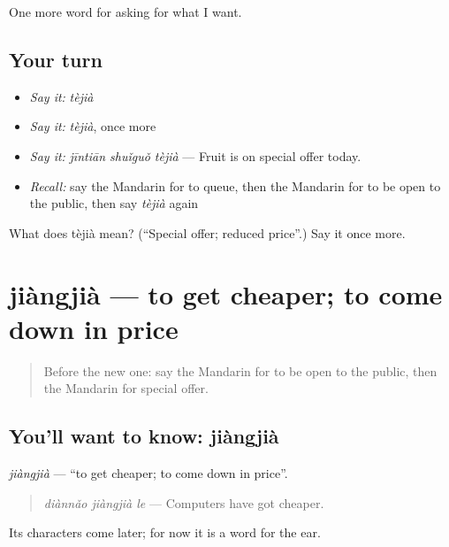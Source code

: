 \begin{grammarlens}[title={What you've built}]
One more word for asking for what I want.
\end{grammarlens}

\subsection*{Your turn}
\begin{itemize}
\raggedright
  \item \emph{Say it:} \emph{tèjià}
  \item \emph{Say it:} \emph{tèjià}, once more
  \item \emph{Say it:} \emph{jīntiān shuǐguǒ tèjià} — Fruit is on special offer today.
  \item \emph{Recall:} say the Mandarin for to queue, then the Mandarin for to be open to the public, then say \emph{tèjià} again
\end{itemize}

\begin{tcolorbox}[breakable,colback=teal!4,colframe=teal!35!black,title={Before you move on}]
What does tèjià mean? (\textquotedblleft{}Special offer; reduced price\textquotedblright{}.) Say it once more.
\end{tcolorbox}
\section[jiàngjià]{jiàngjià — to get cheaper; to come down in price}

\label{lesson:ZH-C193-jiangjia-cheaper}



\begin{quote}
Before the new one: say the Mandarin for to be open to the public, then the Mandarin for special offer.
\end{quote}

\subsection*{You'll want to know: jiàngjià}
\emph{jiàngjià} — \textquotedblleft{}to get cheaper; to come down in price\textquotedblright{}.

\begin{quote}
\emph{diànnǎo jiàngjià le} — Computers have got cheaper.
\end{quote}

Its characters come later; for now it is a word for the ear.

